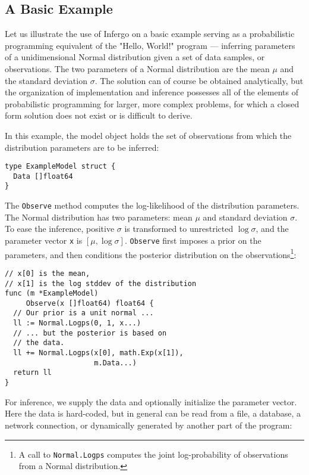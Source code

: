 \documentclass[sigplan,screen]{acmart}
\begin{document}
\begin{sloppypar}
\subsection{A Basic Example}
\label{sec:basic-example}

Let us illustrate the use of Infergo on a basic example serving
as a probabilistic programming equivalent of the "Hello, World!"
program --- inferring parameters of a unidimensional Normal
distribution given a set of data samples, or observations. The
two parameters of a Normal distribution are the mean $\mu$ and
the standard deviation $\sigma$. The solution can of course be
obtained analytically, but the organization of implementation
and inference possesses all of the elements of probabilistic
programming for larger, more complex problems, for which a
closed form solution does not exist or is difficult to derive.

In this example, the model object holds the set of observations
from which the distribution parameters are to be inferred:
\begin{lstlisting}
type ExampleModel struct {
  Data []float64
}
\end{lstlisting}

The \lstinline{Observe} method computes the log-likelihood of
the distribution parameters. The Normal distribution has two
parameters: mean $\mu$ and standard deviation $\sigma$. To ease
the inference, positive $\sigma$ is transformed to unrestricted
$\log \sigma$, and the parameter vector \lstinline{x} is $[\mu,
\log \sigma]$. \lstinline{Observe} first imposes a prior on the
parameters, and then conditions the posterior distribution on
the observations\footnote{A call to \lstinline{Normal.Logps}
computes the joint log-probability of observations from a Normal
distribution.}:

\begin{lstlisting}
// x[0] is the mean,
// x[1] is the log stddev of the distribution
func (m *ExampleModel)
     Observe(x []float64) float64 {
  // Our prior is a unit normal ...
  ll := Normal.Logps(0, 1, x...)
  // ... but the posterior is based on 
  // the data.
  ll += Normal.Logps(x[0], math.Exp(x[1]),
                     m.Data...)
  return ll
}
\end{lstlisting}

For inference, we supply the data and optionally initialize the
parameter vector. Here the data is hard-coded, but in general
can be read from a file, a database, a network connection,
or dynamically generated by another part of the program:


\end{sloppypar}
\end{document}

